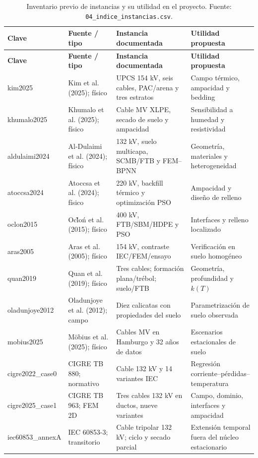 \documentclass[11pt,a4paper,oneside]{report}
\begin{document}
\begin{landscape}
\small
\setlength{\tabcolsep}{3pt}
\begin{longtable}{p{2.0cm}p{2.8cm}p{3.8cm}p{4.8cm}}
\caption{Inventario previo de instancias y su utilidad en el proyecto. Fuente: \texttt{04\_indice\_instancias.csv}.}\label{tab:inventario16}\\
\toprule
\textbf{Clave} & \textbf{Fuente / tipo} & \textbf{Instancia documentada} & \textbf{Utilidad propuesta} \\
\midrule
\endfirsthead
\toprule
\textbf{Clave} & \textbf{Fuente / tipo} & \textbf{Instancia documentada} & \textbf{Utilidad propuesta} \\
\midrule
\endhead
kim2025 & Kim et al. (2025); f\'isico & UPCS 154 kV, seis cables, PAC/arena y tres estratos & Campo t\'ermico, ampacidad y bedding \\
khumalo2025 & Khumalo et al. (2025); f\'isico & Cable MV XLPE, secado de suelo y ampacidad & Sensibilidad a humedad y resistividad \\
aldulaimi2024 & Al-Dulaimi et al. (2024); f\'isico & 132 kV, suelo multicapa, SCMB/FTB y FEM--BPNN & Geometr\'ia, materiales y heterogeneidad \\
atoccsa2024 & Atoccsa et al. (2024); f\'isico & 220 kV, backfill t\'ermico y optimizaci\'on PSO & Ampacidad y dise\~no de relleno \\
oclon2015 & Oc\~lo\'n et al. (2015); f\'isico & 400 kV, FTB/SBM/HDPE y PSO & Interfaces y relleno localizado \\
aras2005 & Aras et al. (2005); f\'isico & 154 kV, contraste IEC/FEM/ensayo & Verificaci\'on en suelo homog\'eneo \\
quan2019 & Quan et al. (2019); f\'isico & Tres cables; formaci\'on plana/tr\'ebol; suelo/FTB & Geometr\'ia, profundidad y $k(T)$ \\
oladunjoye2012 & Oladunjoye et al. (2012); campo & Diez calicatas con propiedades del suelo & Parametrizaci\'on de suelo observada \\
mobius2025 & M\"obius et al. (2025); f\'isico & Cables MV en Hamburgo y 32 a\~nos de datos & Escenarios estacionales de suelo \\
cigre2022\_case0 & CIGRE TB 880; normativo & Cable 132 kV y 14 variantes IEC & Regresi\'on corriente--p\'erdidas--temperatura \\
cigre2025\_case1 & CIGRE TB 963; FEM 2D & Tres cables 132 kV en ductos, nueve variantes & Campo, dominio, interfaces y ampacidad \\
iec60853\_annexA & IEC 60853-3; transitorio & Cable tripolar 132 kV; ciclo y secado parcial & Extensi\'on temporal fuera del n\'ucleo estacionario \\

\end{longtable}
\end{landscape}
\end{document}
